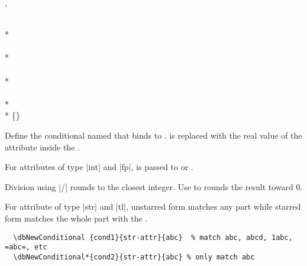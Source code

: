\documentclass[full]{l3doc}
\def\orbar{\textup{\textbar}}
\begin{document}
\begin{documentation}
\begin{function}[added=2022-01-05, updated=2022-01-08]{\dbNewConditional, \dbNewConditional*}
  \begin{syntax}
                \\
    *           \\[2pt]
         \\
    *    \\
         \\
    *    \\
          \\
    *     \\
          
    *     \{\orbar{}\} \\
  \end{syntax}

  Define the conditional named  that binds to . 
  is replaced with the real value of the attribute inside the .
\end{function}

  For attributes of type |int| and |fp|,  is passed to
   or .
  \begin{note}
    Division using |/| rounds to the closest integer. Use  to rounds
    the result toward 0.
  \end{note}

  For attribute of type |str| and |tl|, unstarred form matches any part while
  starred form matches the whole part with the .

\begin{verbatim}
  \dbNewConditional {cond1}{str-attr}{abc}  % match abc, abcd, 1abc, =abc=, etc
  \dbNewConditional*{cond2}{str-attr}{abc} % only match abc
\end{verbatim}


\end{documentation}
\end{document}
